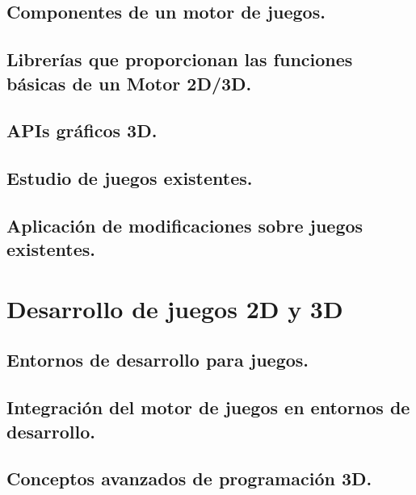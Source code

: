 \documentclass[a4paper,12pt,spanish]{sphinxmanual}
\begin{document}
\section{Componentes de un motor de juegos.}
\label{index:componentes-de-un-motor-de-juegos}

\section{Librerías que proporcionan las funciones básicas de un Motor 2D/3D.}
\label{index:librerias-que-proporcionan-las-funciones-basicas-de-un-motor-2d-3d}

\section{APIs gráficos 3D.}
\label{index:apis-graficos-3d}

\section{Estudio de juegos existentes.}
\label{index:estudio-de-juegos-existentes}

\section{Aplicación de modificaciones sobre juegos existentes.}
\label{index:aplicacion-de-modificaciones-sobre-juegos-existentes}

\chapter{Desarrollo de juegos 2D y 3D}
\label{index:desarrollo-de-juegos-2d-y-3d}

\section{Entornos de desarrollo para juegos.}
\label{index:entornos-de-desarrollo-para-juegos}

\section{Integración del motor de juegos en entornos de desarrollo.}
\label{index:integracion-del-motor-de-juegos-en-entornos-de-desarrollo}

\section{Conceptos avanzados de programación 3D.}
\label{index:conceptos-avanzados-de-programacion-3d}
\end{document}
